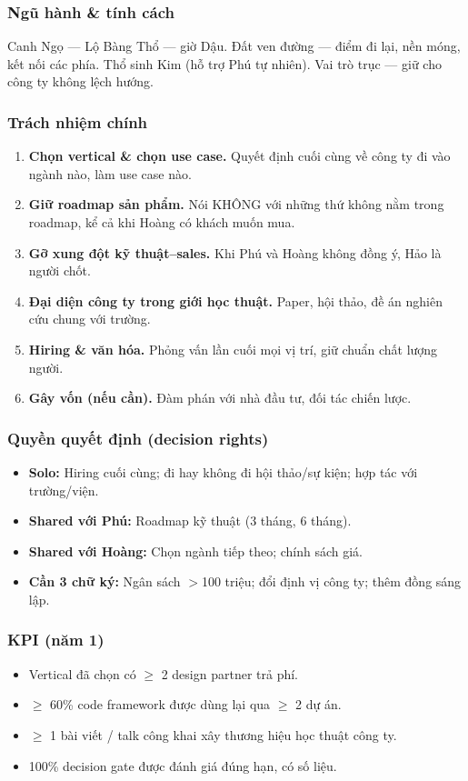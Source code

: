 \documentclass[11pt,a4paper]{article}
\begin{document}
\subsubsection*{Ngũ hành \& tính cách}
Canh Ngọ --- Lộ Bàng Thổ --- giờ Dậu. Đất ven đường --- điểm đi lại, nền móng,
kết nối các phía. Thổ sinh Kim (hỗ trợ Phú tự nhiên). Vai trò trục --- giữ cho
công ty không lệch hướng.

\subsubsection*{Trách nhiệm chính}
\begin{enumerate}
\item \textbf{Chọn vertical \& chọn use case.} Quyết định cuối cùng về công ty
đi vào ngành nào, làm use case nào.
\item \textbf{Giữ roadmap sản phẩm.} Nói KHÔNG với những thứ không nằm trong
roadmap, kể cả khi Hoàng có khách muốn mua.
\item \textbf{Gỡ xung đột kỹ thuật--sales.} Khi Phú và Hoàng không đồng ý, Hảo
là người chốt.
\item \textbf{Đại diện công ty trong giới học thuật.} Paper, hội thảo, đề án
nghiên cứu chung với trường.
\item \textbf{Hiring \& văn hóa.} Phỏng vấn lần cuối mọi vị trí, giữ chuẩn
chất lượng người.
\item \textbf{Gây vốn (nếu cần).} Đàm phán với nhà đầu tư, đối tác chiến lược.
\end{enumerate}

\subsubsection*{Quyền quyết định (decision rights)}
\begin{itemize}
\item \textbf{Solo:} Hiring cuối cùng; đi hay không đi hội thảo/sự kiện; hợp tác với trường/viện.
\item \textbf{Shared với Phú:} Roadmap kỹ thuật (3 tháng, 6 tháng).
\item \textbf{Shared với Hoàng:} Chọn ngành tiếp theo; chính sách giá.
\item \textbf{Cần 3 chữ ký:} Ngân sách $>$100 triệu; đổi định vị công ty; thêm đồng sáng lập.
\end{itemize}

\subsubsection*{KPI (năm 1)}
\begin{itemize}
\item Vertical đã chọn có $\geq$ 2 design partner trả phí.
\item $\geq$ 60\% code framework được dùng lại qua $\geq$ 2 dự án.
\item $\geq$ 1 bài viết / talk công khai xây thương hiệu học thuật công ty.
\item 100\% decision gate được đánh giá đúng hạn, có số liệu.
\end{itemize}
\end{document}
